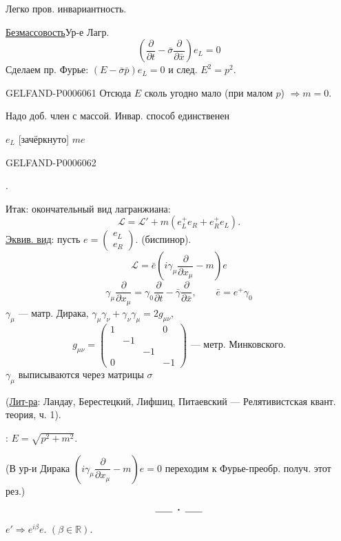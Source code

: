 Легко пров. инвариантность.

\underline{Безмассовость}\qquad Ур-е Лагр.
\[
\left(\frac{\partial}{\partial t}-\bar\sigma\frac{\partial}{\partial\bar x}\right)e_L=0
\]
Сделаем пр. Фурье: \((E-\bar\sigma\bar p)e_L=0\) и след. \(E^2=p^2\).


\begin{GelfandAdjacentEvidence}{GELFAND-P000606}{1}
Отсюда \(E\) сколь угодно мало (при малом \(p\)) \(\Rightarrow m=0\).

Надо доб. член с массой. Инвар. способ единственен

\sout{\(e_L\)} [зачёркнуто] \sout{\(me\)}
\end{GelfandAdjacentEvidence}
\begin{GelfandAdjacentEvidence}{GELFAND-P000606}{2}

\begin{center}
.
\end{center}
Итак: окончательный вид лагранжиана:
\[
\mathcal L=\mathcal L'+m(e_L^+e_R+e_R^+e_L).
\]
\underline{\underline{Эквив. вид}}: пусть \(e=\begin{pmatrix}e_L\\e_R\end{pmatrix}\). (биспинор).
\[
\mathcal L=\bar e\left(i\gamma_\mu\frac{\partial}{\partial x_\mu}-m\right)e
\]
\[
\gamma_\mu\frac{\partial}{\partial x_\mu}
=\gamma_0\frac{\partial}{\partial t}-\bar\gamma\frac{\partial}{\partial\bar x},
\qquad \bar e=e^+\gamma_0
\]
\(\gamma_\mu\) — матр. Дирака,
\(\gamma_\mu\gamma_\nu+\gamma_\nu\gamma_\mu=2g_{\mu\nu}\),
\[
g_{\mu\nu}=\begin{pmatrix}
1&&&0\\
&-1&&\\
&&-1&\\
0&&&-1
\end{pmatrix}\text{ — метр. Минковского.}
\]
\(\gamma_\mu\) выписываются через матрицы \(\sigma\)

(\underline{Лит-ра}: Ландау, Берестецкий, Лифшиц, Питаевский — Релятивистская квант. теория, ч. 1).

: \(E=\sqrt{p^2+m^2}\).

(В ур-и Дирака \(\left(i\gamma_\mu\dfrac{\partial}{\partial x_\mu}-m\right)e=0\)
переходим к Фурье-преобр. получ. этот рез.)
\[
\rule{1.8em}{.4pt}\;\boldsymbol{\cdot}\;\rule{1.8em}{.4pt}
\]
\qquad \(e'\Rightarrow e^{i\beta}e\). \((\beta\in\mathbb R)\).
\end{GelfandAdjacentEvidence}
